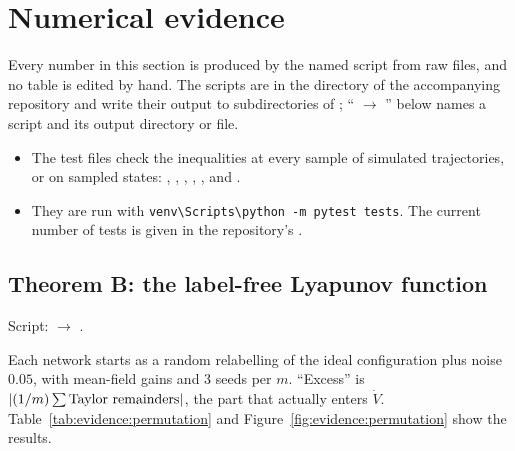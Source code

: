 \section{Numerical evidence}\label{sec:evidence}

Every number in this section is produced by the named script from raw files, and no table is edited by hand. The
scripts are in the directory  of the accompanying repository and write their output to
subdirectories of ; `` $\to$ '' below names a script and its output
directory or file.

\begin{itemize}
  \item \begin{sloppypar}The test files check the inequalities at every sample of simulated trajectories, or on
    sampled states: , , ,
    , ,  and
    .\end{sloppypar}
  \item They are run with \texttt{venv\textbackslash Scripts\textbackslash python -m pytest tests}. The current
    number of tests is given in the repository's .
\end{itemize}

\subsection{Theorem B: the label-free Lyapunov function}

Script:  $\to$ .

Each network starts as a random relabelling of the ideal configuration plus noise $0.05$, with mean-field gains and
3 seeds per $m$. ``Excess'' is $\lvert (1/m)\sum\text{Taylor remainders}\rvert$, the part that actually enters $\dot V$.
Table~\ref{tab:evidence:permutation} and Figure~\ref{fig:evidence:permutation} show the results.

